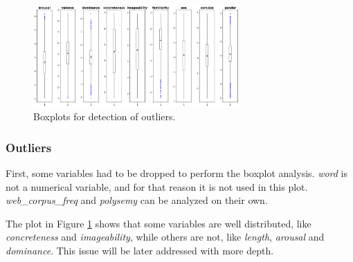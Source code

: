 \documentclass[a4paper,11pt,dvipsnames]{article}
\begin{document}


\begin{figure}[h]
    \centering
    \includegraphics[width=0.7\textwidth]{Graphs/outliers.png}
    \caption{Boxplots for detection of outliers.}
    \label{fig:outliers}
\end{figure}
\subsubsection{Outliers}


First, some variables had to be dropped to perform the boxplot analysis. \textit{word} is not a numerical variable, and for that reason it is not used in this plot. \textit{web\_corpus\_freq} and \textit{polysemy} can be analyzed on their own.


The plot in Figure \ref{fig:outliers} shows that some variables are well distributed, like \textit{concreteness} and \textit{imageability}, while others are not, like \textit{length}, \textit{arousal} and \textit{dominance}. This issue will be later addressed with more depth.
\end{document}
